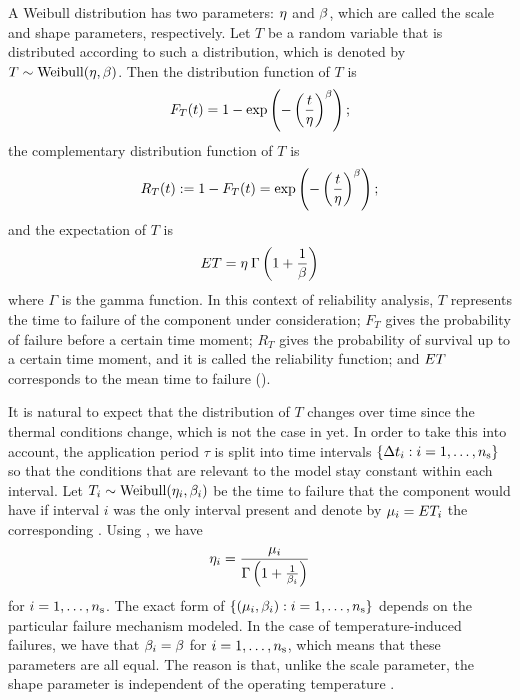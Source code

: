 A Weibull distribution has two parameters: $\eta$ and $\beta$, which are
called the scale and shape parameters, respectively. Let $T$ be a random
variable that is distributed according to such a distribution, which is denoted
by $T \sim \mathrm{Weibull}(\eta, \beta)$. Then the distribution function
\cite{durrett2010} of $T$ is
\begin{equation} \elab{weibull-distribution}
  F_T(t) = 1 - \exp\left(-\left(\frac{t}{\scale}\right)^\shape\right);
\end{equation}
the complementary distribution function of $T$ is
\begin{equation} \elab{weibull-survival}
  R_T(t) := 1 - F_T(t) = \exp\left(-\left(\frac{t}{\scale}\right)^\shape\right);
\end{equation}
and the expectation of $T$ is
\begin{equation} \elab{weibull-expectation}
  \expectation{T} = \scale \: \Gamma\left(1 + \frac{1}{\shape}\right)
\end{equation}
where $\Gamma$ is the gamma function. In this context of reliability analysis,
$T$ represents the time to failure of the component under consideration; $F_T$
gives the probability of failure before a certain time moment; $R_T$ gives the
probability of survival up to a certain time moment, and it is called the
reliability function; and $E T$ corresponds to the mean time to
failure ().

It is natural to expect that the distribution of $T$ changes over time since the
thermal conditions change, which is not the case in 
yet. In order to take this into account, the application period $\tau$ is split
into \ns time intervals $\{ \Delta t_i: i = 1, \dots, {n_\mathrm{s}} \}$ so that the conditions
that are relevant to the model stay constant within each interval. Let $T_i \sim
\mathrm{Weibull}(\eta_i, \beta_i)$ be the time to failure that the component
would have if interval $i$ was the only interval present and denote by $\mu_i
= E T_i$ the corresponding . Using
, we have
\begin{equation} \elab{reliability-scale-one}
  \scale_i = \frac{\mean_i}{\Gamma\left(1 + \frac{1}{\shape_i}\right)}
\end{equation}
for $i = 1, \dots, {n_\mathrm{s}}$. The exact form of $\{ (\mu_i, \beta_i): i =
1, \dots, {n_\mathrm{s}} \}$ depends on the particular failure mechanism modeled. In the
case of temperature-induced failures, we have that $\beta_i = \beta$ for $i =
1, \dots, {n_\mathrm{s}}$, which means that these parameters are all equal. The reason is
that, unlike the scale parameter, the shape parameter is independent of the
operating temperature \cite{chang2006}.

